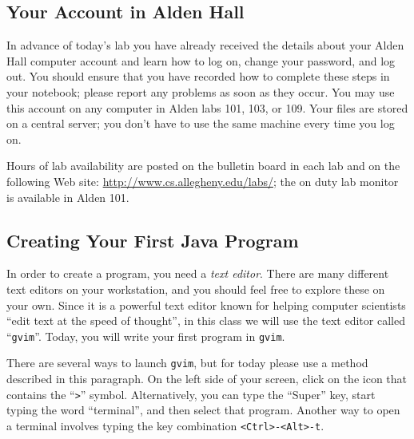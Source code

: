 \vspace*{-.3in}
\subsection*{Your Account in Alden Hall}

In advance of today's lab you have already received the details about your Alden Hall computer account and learn how to
log on, change your password, and log out.  You should ensure that you have recorded how to complete these steps in your
notebook; please report any problems as soon as they occur. You may use this account on any computer in Alden labs 101,
103, or 109. Your files are stored on a central server; you don't have to use the same machine every time you log on.

Hours of lab availability are posted on the bulletin board in each lab and on the following Web site:
\url{http://www.cs.allegheny.edu/labs/}; the on duty lab monitor is available in Alden 101.

\vspace*{-.1in}
\subsection*{Creating Your First Java Program}

In order to create a program, you need a {\em text editor}. There are many different text editors on your workstation, and
you should feel free to explore these on your own. Since it is a powerful text editor known for helping computer
scientists ``edit text at the speed of thought'', in this class we will use the text editor called ``{\tt gvim}''.
Today, you will write your first program in {\tt gvim}.


There are several ways to launch {\tt gvim}, but for today please use a method described in this paragraph.  On the
left side of your screen, click on the icon that contains the ``{\tt >}'' symbol.  Alternatively, you can type the
``Super'' key, start typing the word ``terminal'', and then select that program.  Another way to open a terminal
involves typing the key combination {\tt <Ctrl>-<Alt>-t}.


